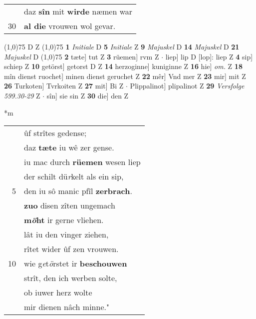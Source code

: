 \documentclass[8pt,a4paper,notitlepage]{article}
\begin{document}
\begin{table}[ht]
\begin{minipage}[t]{0.5\linewidth}
\begin{tabular}{rl}
 & daz \textbf{sîn} mit \textbf{wirde} næmen war\\ 
30 & \textbf{al die} vrouwen wol gevar.\\ 
\end{tabular}
\scriptsize
\line(1,0){75} \newline
D Z \newline
\line(1,0){75} \newline
\textbf{1} \textit{Initiale} D  \textbf{5} \textit{Initiale} Z  \textbf{9} \textit{Majuskel} D  \textbf{14} \textit{Majuskel} D  \textbf{21} \textit{Majuskel} D  \newline
\line(1,0){75} \newline
\textbf{2} tæte] tut Z \textbf{3} rüemen] rvm Z  $\cdot$ liep] lip D [lop]: liep Z \textbf{4} sip] schiep Z \textbf{10} getörst] getorst D Z \textbf{14} herzoginne] kuniginne Z \textbf{16} hie] \textit{om.} Z \textbf{18} mîn dienst ruochet] minen dienst geruchet Z \textbf{22} mêr] Vnd mer Z \textbf{23} mir] mit Z \textbf{26} Turkoten] Tvrkoiten Z \textbf{27} mit] Bi Z  $\cdot$ Plippalinot] plipalinot Z \textbf{29} \textit{Versfolge 599.30-29} Z   $\cdot$ sîn] sie sin Z \textbf{30} die] den Z \newline
\end{minipage}
\hspace{0.5cm}
\begin{minipage}[t]{0.5\linewidth}
\small
\begin{center}*m
\end{center}
\begin{tabular}{rl}
 & ûf strîtes gedense;\\ 
 & daz \textbf{tæte} iu wê zer gense.\\ 
 & iu mac durch \textbf{rüemen} wesen liep\\ 
 & der schilt dü\textit{r}kelt als ein sip,\\ 
5 & den iu sô manic pfîl \textbf{zerbrach}.\\ 
 & \textbf{zuo} disen zîten ungemach\\ 
 & \textbf{m\textit{ö}ht} ir gerne vliehen.\\ 
 & lât iu den vinger ziehen,\\ 
 & rîtet wider ûf zen vrouwen.\\ 
10 & wie g\textit{e}t\textit{ö}rstet ir \textbf{beschouwen}\\ 
 & strît, den ich werben solte,\\ 
 & ob iuwer herz wolte\\ 
 & mir dienen nâch minne."\\ 

\end{tabular}
\end{minipage}
\end{table}
\end{document}

